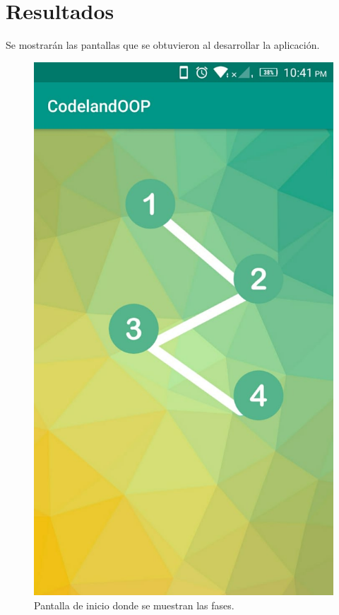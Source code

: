 \chapter{Resultados}

Se mostrarán las pantallas que se obtuvieron al desarrollar la aplicación.

\begin{figure}[H]
	\begin{center}
		\includegraphics[scale=0.3]{img/ss1.jpeg} 
		\caption{Pantalla de inicio donde se muestran las fases.}
		\label{fases}
	\end{center}
\end{figure}

